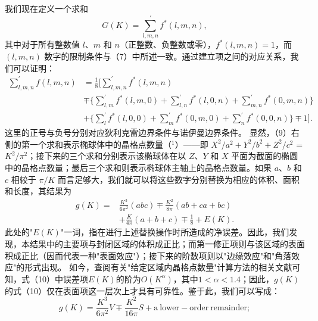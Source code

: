 我们现在定义一个求和
\begin{equation}\tag{17.1.8}\label{eq:17.1.8}
G ( K ) = \sum _ { l , m , n } ^{\prime} f ^{*} ( l , m , n ) ,
\end{equation}
其中对于所有整数值 \(l\)、\(m\) 和 \(n\)（正整数、负整数或零），\(f^{*}(l,m,n)=1\)，而 \((l,m,n)\) 数字的限制条件与（7）中所述一致。通过建立项之间的对应关系，我们可以证明：
\begin{equation}\tag{17.1.9}\label{eq:17.1.9}
\begin{aligned}
\sum_{l,m,n}^{\prime} f(l,m,n)
&= \frac{1}{8}\Bigg[
\sum_{l,m,n}^{\prime} f^{*}(l,m,n) \\
&\mp \Big\{
\sum_{l,m}^{\prime} f^{*}(l,m,0)
+ \sum_{l,n}^{\prime} f^{*}(l,0,n)
+ \sum_{m,n}^{\prime} f^{*}(0,m,n)
\Big\} \\
&+ \Big\{
\sum_{l}^{\prime} f^{*}(l,0,0)
+ \sum_{m}^{\prime} f^{*}(0,m,0)
+ \sum_{n}^{\prime} f^{*}(0,0,n)
\Big\}
\mp 1
\Bigg].
\end{aligned}
\end{equation}
这里的正号与负号分别对应狄利克雷边界条件与诺伊曼边界条件。
显然，（9）右侧的第一个求和表示椭球体中的晶格点数量（\(^{1}\)）——即 \(X^{2}/a^{2}+Y^{2}/b^{2}+Z^{2}/c^{2}\) = \(K^{2}/\pi^{2}\)；接下来的三个求和分别表示该椭球体在以 \(Z\)、\(Y\) 和 \(X\) 平面为截面的椭圆中的晶格点数量；最后三个求和则表示椭球体主轴上的晶格点数量。如果 \(a\)、\(b\) 和 \(c\) 相较于 \(\pi/K\) 而言足够大，我们就可以将这些数字分别替换为相应的体积、面积和长度，其结果为
\begin{equation}\tag{17.1.10}\label{eq:17.1.10}
\begin{aligned}
g(K)={}&\frac{K^3}{6\pi^2}(abc)
\mp \frac{K^2}{8\pi}(ab+ca+bc) \\
&+ \frac{K}{4\pi}(a+b+c)
\mp \frac{1}{8}
+ E(K).
\end{aligned}
\end{equation}
此处的"\(E(K)\)"一词，指在进行上述替换操作时所造成的净误差。因此，我们发现，本结果中的主要项与封闭区域的体积成正比；而第一修正项则与该区域的表面积成正比（因而代表一种"表面效应"）；接下来的阶数项则以"边缘效应"和"角落效应"的形式出现。
如今，查阅有关"给定区域内晶格点数量"计算方法的相关文献可知，式（10）中误差项\(E(K)\)的阶为\(O(K^{\alpha})\)，其中\(1 < \alpha < 1.4\)；因此，\(g(K)\)的式（10）仅在表面项这一层次上才具有可靠性。鉴于此，我们可以写成：
\begin{equation}\tag{17.1.11}\label{eq:17.1.11}
g ( K ) = \frac { K ^{3} } { 6 \pi ^{2} } V \mp \frac { K ^{2} } { 16 \pi } S + \mathrm { a ~ l o w e r - o r d e r ~ r e m a i n d e r } ;
\end{equation}
